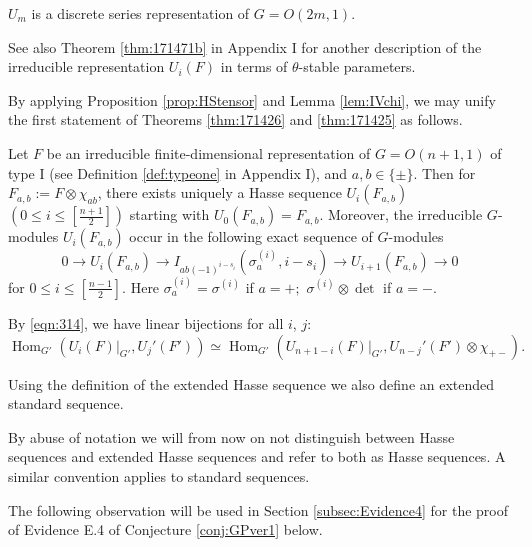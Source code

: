 \begin{remark}
\label{rem:Umdisc}
$U_m$ is a discrete series representation
 of $G=O(2m,1)$.  
\end{remark}



See also Theorem \ref{thm:171471b} in Appendix I
 for another description of the irreducible representation
 $U_i(F)$ in terms of $\theta$-stable parameters.  



By applying Proposition \ref{prop:HStensor} and Lemma \ref{lem:IVchi},
 we may unify the first statement of Theorems \ref{thm:171426}
 and \ref{thm:171425}
 as follows.  
\begin{theorem}
\label{thm:1714107}
Let $F$ be an irreducible finite-dimensional representation of $G=O(n+1,1)$
 of type I
 (see Definition \ref{def:typeone} in Appendix I), 
 and $a,b \in \{\pm\}$.  
Then for $F_{a, b}:= F \otimes \chi_{a b}$, 
 there exists uniquely a Hasse sequence
 $U_i(F_{a,b})$  $(0 \le i \le [\frac{n+1}{2}])$ 
 starting with $U_0(F_{a, b})=F_{a, b}$.  
Moreover, 
 the irreducible $G$-modules $U_i(F_{a,b})$ occur 
 in the following exact sequence of $G$-modules
\[
   0 \to U_i(F_{a, b}) \to I_{a b (-1)^{i-s_i}}(\sigma_a^{(i)}, i-s_i)
      \to U_{i+1}(F_{a, b}) \to 0
\]
for $0 \le i \le [\frac{n-1}{2}]$. 
Here $\sigma_a^{(i)}=\sigma^{(i)}$ if $a=+;$
$\sigma^{(i)} \otimes \det$ if $a=-$.  
\end{theorem}

\medskip
\noindent
\begin{remark}
\label{remark:171478}
By \eqref{eqn:314}, 
 we have linear bijections for all $i$, $j$:
\[
{\operatorname{Hom}}_{G'}
 (U_i(F)|_{G'}, U_j'(F'))
\simeq
{\operatorname{Hom}}_{G'}
 (U_{n+1-i}(F)|_{G'}, U_{n-j}'(F') \otimes \chi_{+-}).  
\]
\end{remark}

\medskip
\begin{remark}
Using the definition of the extended Hasse sequence we also define an extended standard sequence.
\end{remark}
\medskip

By abuse of notation we will from now on not distinguish between Hasse sequences and extended Hasse sequences and refer to both as Hasse sequences. A similar convention applies to standard sequences.

\medskip
The following observation will be used 
 in Section \ref{subsec:Evidence4}
 for the proof of Evidence E.4
 of Conjecture \ref{conj:GPver1} below.  

